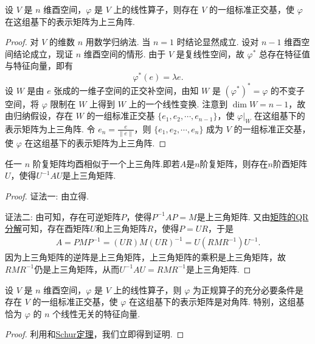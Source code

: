 \documentclass[../../main.tex]{subfiles}
\begin{document}
\begin{theorem}[Schur(舒尔)定理]\label{theorem:Schur(舒尔)定理}
设 $V$ 是 $n$ 维酉空间，$\varphi$ 是 $V$ 上的线性算子，则存在 $V$ 的一组标准正交基，使 $\varphi$ 在这组基下的表示矩阵为上三角阵.
\end{theorem}
\begin{proof}
对 $V$ 的维数 $n$ 用数学归纳法. 当 $n = 1$ 时结论显然成立. 设对 $n - 1$ 维酉空间结论成立，现证 $n$ 维酉空间的情形. 由于 $V$ 是复线性空间，故 $\varphi^*$ 总存在特征值与特征向量，即有
\[
\varphi^*(e) = \lambda e.
\]
设 $W$ 是由 $e$ 张成的一维子空间的正交补空间，由知 $W$ 是 $(\varphi^*)^* = \varphi$ 的不变子空间，将 $\varphi$ 限制在 $W$ 上得到 $W$ 上的一个线性变换. 注意到 $\dim W = n - 1$，故由归纳假设，存在 $W$ 的一组标准正交基 $\{e_1,e_2,\cdots,e_{n - 1}\}$，使 $\varphi|_W$ 在这组基下的表示矩阵为上三角阵. 令 $e_n = \frac{e}{\|e\|}$，则 $\{e_1,e_2,\cdots,e_n\}$ 成为 $V$ 的一组标准正交基，使 $\varphi$ 在这组基下的表示矩阵为上三角阵.

\end{proof}

\begin{corollary}[Schur定理]\label{corollary:Schur(舒尔)定理}
任一 $n$ 阶复矩阵均酉相似于一个上三角阵.即若\(A\)是\(n\)阶复矩阵，则存在\(n\)阶酉矩阵\(U\)，使得\(U^{-1}AU\)是上三角矩阵.
\end{corollary}
\begin{proof}
{\color{blue}证法一:}
由立得.

{\color{blue}证法二:}
由可知，存在可逆矩阵\(P\)，使得\(P^{-1}AP = M\)是上三角矩阵. 又由\hyperref[theorem:矩阵的QR分解]{矩阵的QR分解}可知，存在酉矩阵\(U\)和上三角矩阵\(R\)，使得\(P = UR\)，于是
\begin{align*}
A = PMP^{-1}=(UR)M(UR)^{-1}=U(RMR^{-1})U^{-1}.
\end{align*}
因为上三角矩阵的逆阵是上三角矩阵，上三角矩阵的乘积是上三角矩阵，故\(RMR^{-1}\)仍是上三角矩阵，从而\(U^{-1}AU = RMR^{-1}\)是上三角矩阵. 

\end{proof}

\begin{theorem}
设 $V$ 是 $n$ 维酉空间，$\varphi$ 是 $V$ 上的线性算子，则 $\varphi$ 为正规算子的充分必要条件是存在 $V$ 的一组标准正交基，使 $\varphi$ 在这组基下的表示矩阵是对角阵. 特别，这组基恰为 $\varphi$ 的 $n$ 个线性无关的特征向量.
\end{theorem}
\begin{proof}
利用和\hyperref[corollary:Schur(舒尔)定理]{Schur定理}，我们立即得到证明.

\end{proof}
\end{document}
